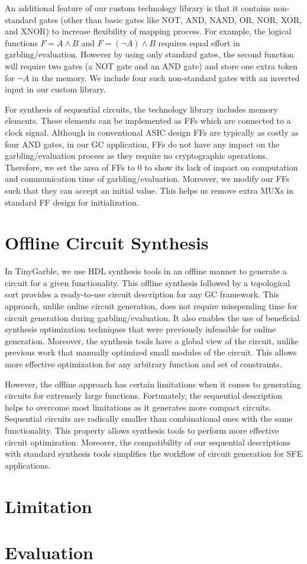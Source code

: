 An additional feature of our custom technology library is that it contains non-standard gates (other than basic gates like NOT, AND, NAND, OR, NOR, XOR, and XNOR) to increase flexibility of mapping process.
For example, the logical functions $F = A\wedge B$ and $F = (\neg A)\wedge B$ requires equal effort in garbling/evaluation.
However by using only standard gates, the second function will require two gates (a NOT gate and an AND gate) and store one extra token for $\neg A$ in the memory.
We include four such non-standard gates with an inverted input in our custom library.

For synthesis of sequential circuits, the technology library includes memory elements.
These elements can be implemented as FFs which are connected to a clock signal.
Although in conventional ASIC design FFs are typically as costly as four AND gates, in our GC application, FFs do not have any impact on the garbling/evaluation process as they require no cryptographic operations.
Therefore, we set the area of FFs to 0 to show its lack of impact on computation and communication time of garbling/evaluation.
Moreover, we modify our FFs such that they can accept an initial value.
This helps us remove extra MUXs in standard FF design for initialization.

\section{Offline Circuit Synthesis}
In TinyGarble, we use HDL synthesis tools in an offline manner to generate a circuit for a given functionality.
This offline synthesis followed by a topological sort provides a ready-to-use circuit description for any GC framework.
This approach, unlike online circuit generation, does not require misspending time for circuit generation during garbling/evaluation.
It also enables the use of beneficial synthesis optimization techniques that were previously infeasible for online generation.
Moreover, the synthesis tools have a global view of the circuit, unlike previous work that manually optimized small modules of the circuit.
This allows more effective optimization for any arbitrary function and set of constraints.

However, the offline approach has certain limitations when it comes to generating circuits for extremely large functions.
Fortunately, the sequential description helps to overcome most limitations as it generates more compact circuits.
Sequential circuits are radically smaller than combinational ones with the same functionality.
This property allows synthesis tools to perform more effective circuit optimization.
Moreover, the compatibility of our sequential descriptions with standard synthesis tools simplifies the workflow of circuit generation for SFE applications.

\section{Limitation}


\section{Evaluation}
